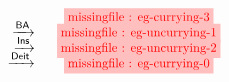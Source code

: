 \setlength{\fboxsep}{2pt}
\setlength{\arraycolsep}{0pt}
\newcommand{\vsp}{\vspace{-0.5em}}
\newcommand{\stkf}{\tikzfig{0.9}{0.5}}
$$
\begin{array}{r@{\quad}c@{\vsp}}
                                  &\stkf{eg-currying-3} \\
       \xstep{\mathsf{BA}} &\stkf{eg-uncurrying-1} \\
       \xstep{\mathsf{Ins}} &\stkf{eg-uncurrying-2} \\
       \xstep{\mathsf{Deit}} &\stkf{eg-currying-0}
\end{array}
$$